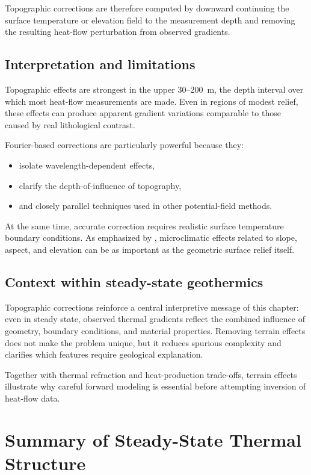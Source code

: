 Topographic corrections are therefore computed by downward continuing the surface temperature or elevation field to the measurement depth and removing the resulting heat-flow perturbation from observed gradients.

\subsection{Interpretation and limitations}

Topographic effects are strongest in the upper 30--\SI{200}{m}, the depth interval over which most heat-flow measurements are made. Even in regions of modest relief, these effects can produce apparent gradient variations comparable to those caused by real lithological contrast.

Fourier-based corrections are particularly powerful because they:
\begin{itemize}
\item isolate wavelength-dependent effects,
\item clarify the depth-of-influence of topography,
\item and closely parallel techniques used in other potential-field methods.
\end{itemize}

At the same time, accurate correction requires realistic surface temperature boundary conditions. As emphasized by \citet{Blackwell_etal1980}, microclimatic effects related to slope, aspect, and elevation can be as important as the geometric surface relief itself.

\subsection{Context within steady-state geothermics}

Topographic corrections reinforce a central interpretive message of this chapter: even in steady state, observed thermal gradients reflect the combined influence of geometry, boundary conditions, and material properties. Removing terrain effects does not make the problem unique, but it reduces spurious complexity and clarifies which features require geological explanation.

Together with thermal refraction and heat-production trade-offs, terrain effects illustrate why careful forward modeling is essential before attempting inversion of heat-flow data.

\section{Summary of Steady-State Thermal Structure}

